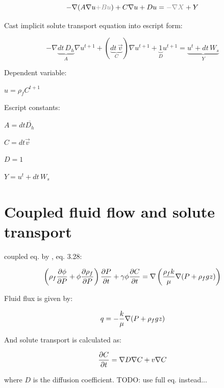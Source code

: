 \documentclass[11pt]{article}
\begin{document}
\begin{equation}
     - \nabla (A \nabla u {\color{gray}+ B u }) + C \nabla u + D u  = {\color{gray}- \nabla X } + Y
\end{equation}

Cast implicit solute transport equation into escript form:

\begin{equation}
    - \nabla \underbrace{dt \, D_h}_A \nabla u^{t+1} + ( \underbrace{ dt \, \vec{v}}_C ) \nabla u^{t+1} + \underbrace{1}_D u^{t+1}  =  \underbrace{u^t + dt \, W_s}_Y
\end{equation}

Dependent variable:

$ u = \rho_f C^{t+1} $

Escript constants:

$ A = dt \overline{D_h} $

$ C = dt \vec{v} $

$ D = 1 $

$ Y = u^t + dt \, W_s $


\pagebreak

\section{Coupled fluid flow and solute transport}

coupled eq. by \cite{Ingebritsen2006}, eq. 3.28:

\begin{equation}
   \label{eq:gwflow_final}
   \left( \rho_f {\partial \phi \over{\partial P} } + \phi {\partial \rho_f \over{\partial P} } \right) {\partial P \over{\partial {t} } } + \gamma \phi {\partial C \over {\partial t } } = \nabla \left( {\rho_f k \over{\mu} } \nabla (P + \rho_f g z ) \right)
\end{equation}

Fluid flux is given by:

\begin{equation}
    \label{eq:Darcy_final}
    q = - {k \over{\mu}} \nabla (P + \rho_f g z)
\end{equation}

And solute transport is calculated as:

\begin{equation}
   \label{eq:solute_transport_final}
    {\partial C \over{\partial t} } = \nabla D \nabla C  + v \nabla C
\end{equation}

where $D$ is the diffusion coefficient. TODO: use full eq. instead...
\end{document}
